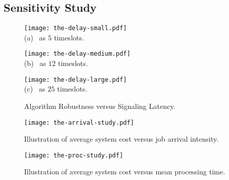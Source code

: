 \subsection{Sensitivity Study}
\label{subsec:advance}
\begin{figure*}[ht!]                                                                %
    \centering                                                                      %
    \begin{minipage}[b]{0.30\textwidth}                                             %
        \texttt{[image: the-delay-small.pdf]} \\                  %
        {(a) \brlatency~as $5$ timeslots.}                                               %
    \end{minipage}                                                                  %
    \begin{minipage}[b]{0.30\textwidth}                                             %
        \texttt{[image: the-delay-medium.pdf]} \\                 %
        {(b) \brlatency~as $12$ timeslots.}           %
    \end{minipage}                                                                  %
    \begin{minipage}[b]{0.30\textwidth}                                             %
        \texttt{[image: the-delay-large.pdf]} \\                  %
        {(c) \brlatency~as $25$ timeslots.}             %
    \end{minipage}                                                                  %
    \caption{Algorithm Robustness versus Signaling Latency.}                        %
    \label{fig:ss_signal}                                                           %
\end{figure*}                                                                       %

\begin{figure}[ht!]
    \centering
    \begin{minipage}[b]{0.23\textwidth}
        \texttt{[image: the-arrival-study.pdf]}
        \caption{Illustration of average system cost versus job arrival intensity.}
        \label{fig:ss_scale}
    \end{minipage}
    \begin{minipage}[b]{0.23\textwidth}
        \texttt{[image: the-proc-study.pdf]}
        \caption{Illustration of average system cost versus mean processing time.}
        \label{fig:ss_dist}
    \end{minipage}
\end{figure}

